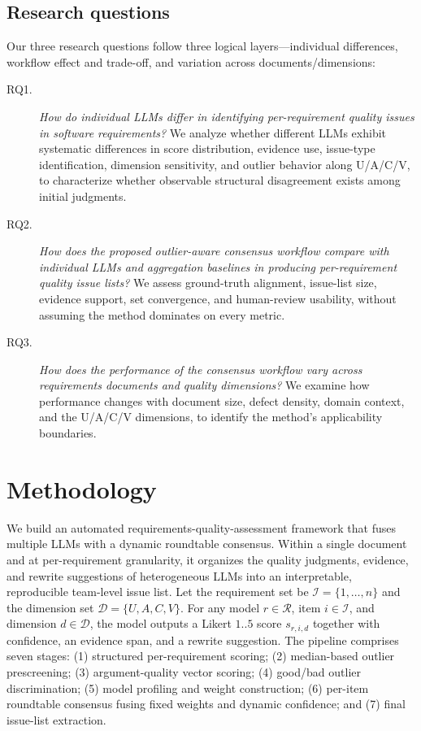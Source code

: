 \documentclass[sn-mathphys-num]{sn-jnl}
\begin{document}
\subsection{Research questions}
Our three research questions follow three logical layers---individual differences, workflow effect and trade-off, and variation across documents/dimensions:
\begin{description}
\item[RQ1.] \emph{How do individual LLMs differ in identifying per-requirement quality issues in software requirements?} We analyze whether different LLMs exhibit systematic differences in score distribution, evidence use, issue-type identification, dimension sensitivity, and outlier behavior along U/A/C/V, to characterize whether observable structural disagreement exists among initial judgments.
\item[RQ2.] \emph{How does the proposed outlier-aware consensus workflow compare with individual LLMs and aggregation baselines in producing per-requirement quality issue lists?} We assess ground-truth alignment, issue-list size, evidence support, set convergence, and human-review usability, without assuming the method dominates on every metric.
\item[RQ3.] \emph{How does the performance of the consensus workflow vary across requirements documents and quality dimensions?} We examine how performance changes with document size, defect density, domain context, and the U/A/C/V dimensions, to identify the method's applicability boundaries.
\end{description}

\section{Methodology}\label{sec:method}
We build an automated requirements-quality-assessment framework that fuses multiple LLMs with a dynamic roundtable consensus. Within a single document and at per-requirement granularity, it organizes the quality judgments, evidence, and rewrite suggestions of heterogeneous LLMs into an interpretable, reproducible team-level issue list. Let the requirement set be $\mathcal{I}=\{1,\dots,n\}$ and the dimension set $\mathcal{D}=\{U,A,C,V\}$. For any model $r\in\mathcal{R}$, item $i\in\mathcal{I}$, and dimension $d\in\mathcal{D}$, the model outputs a Likert $1..5$ score $s_{r,i,d}$ together with confidence, an evidence span, and a rewrite suggestion. The pipeline comprises seven stages: (1) structured per-requirement scoring; (2) median-based outlier prescreening; (3) argument-quality vector scoring; (4) good/bad outlier discrimination; (5) model profiling and weight construction; (6) per-item roundtable consensus fusing fixed weights and dynamic confidence; and (7) final issue-list extraction.
\end{document}
